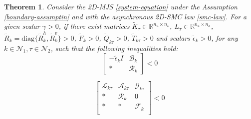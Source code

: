 \documentclass[journal,final,twocolumn]{IEEEtran}
\newtheorem{theorem}{Theorem}
\begin{document}
\begin{theorem}\label{theorem3}
	Consider the 2D-MJS \eqref{system-equation} under the Assumption \eqref{boundary-assumptin} and with the asynchronous 2D-SMC law \eqref{smc-law}.  For a given scalar $\gamma>0$, if there exist matrices $\tilde{K}_{\tau }\in\mathbb{R}^{n_u\times n_x}$, $L_{\tau }\in\mathbb{R}^{n_x\times n_x}$, $\tilde{R}_{k}=\mathrm{diag}\{\tilde{R}^{h}_{k},\tilde{R}^{v}_{k}\}>0$, $\tilde{F}_{k}>0$,  $\tilde{Q}_{k\tau }>0$, $\tilde{T}_{k\tau }>0$ and scalars $\tilde{\epsilon}_{k}>0$, for any $k\in\mathcal{N}_{1}, \tau\in\mathcal{N}_{2}$,  such that the following inequalities hold: 
	\begin{equation} \label{T3C1}
		\begin{bmatrix}
			-\tilde{\epsilon}_{k}I &\mathscr{B}_{k}\\
			*& \mathscr{R}_{k}
		\end{bmatrix} < 0
	\end{equation}
	
	\begin{equation} \label{T3C2}
		\begin{bmatrix}
			\mathscr{L}_{k\tau }&\mathscr{A}_{k\tau }&\mathscr{G}_{k\tau }\\
			*&\mathscr{R}_{k}&0\\
			*&*&\mathscr{F}_{k}\\
		\end{bmatrix}<0
	\end{equation}
	

\end{theorem}
\end{document}
